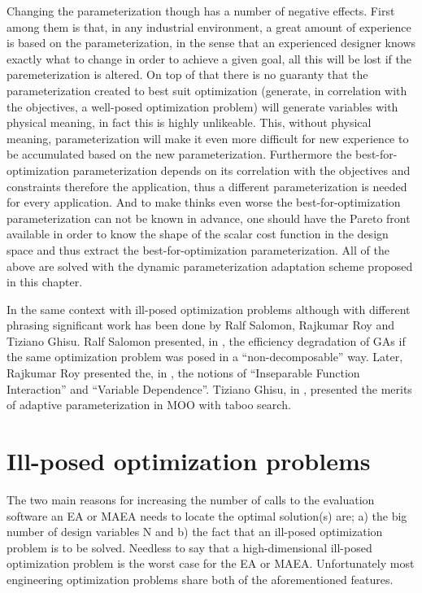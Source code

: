 Changing the parameterization though has a number of negative effects. First among them is that, in any industrial environment, a great amount of experience is based on the parameterization, in the sense that an experienced designer knows exactly what to change in order to achieve a given goal, all this will be lost if the paremeterization is altered. On top of that there is no guaranty that the parameterization created to best suit optimization (generate, in correlation with the objectives, a well-posed optimization problem) will generate variables with physical meaning, in fact this is highly unlikeable. This, without physical meaning, parameterization will make it even more difficult for new experience to be accumulated based on the new parameterization. Furthermore the best-for-optimization parameterization depends on its correlation with the objectives and constraints therefore the application, thus a different parameterization is needed for every application. And to make thinks even worse the best-for-optimization parameterization can not be known in advance, one should have the Pareto front available in order to know the shape of the scalar cost function in the design space and thus extract the best-for-optimization parameterization. All of the above are solved with the dynamic parameterization adaptation scheme proposed in this chapter.                 

In the same context with ill-posed optimization problems although with different phrasing significant work has been done by Ralf Salomon, Rajkumar Roy and Tiziano Ghisu. 
Ralf Salomon presented, in \cite{Salomon}, the efficiency degradation of GAs if the same optimization problem was posed in a ``non-decomposable'' way. Later, Rajkumar Roy presented the, in \cite{Roy_2002a}, the notions of ``Inseparable Function Interaction'' and ``Variable Dependence''. Tiziano Ghisu, in \cite{Ghisu_2010}, presented the merits of adaptive parameterization in MOO with taboo search. 

 

\section{Ill-posed optimization problems}
\label{illpost}
The two main reasons for increasing the number of calls to the evaluation software an EA or MAEA needs to locate the optimal solution(s) are; a) the big number of design variables N and b) the fact that an ill-posed optimization problem is to be solved. Needless to say that a high-dimensional ill-posed optimization problem is the worst case for the EA or MAEA.  Unfortunately most engineering optimization problems share both of the aforementioned features. 


